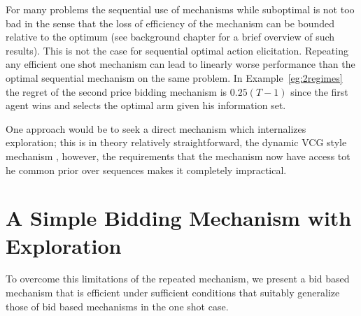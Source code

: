 For many problems the sequential use of mechanisms while suboptimal is not too bad in the sense that the loss of efficiency of the mechanism can be bounded relative to the optimum (see background chapter for a brief overview of such results).
This is not the case for sequential optimal action elicitation. Repeating any efficient one shot mechanism can lead to linearly worse performance than the optimal sequential mechanism on the same problem. In Example~\ref{eg:2regimes} the regret of the  second price bidding mechanism is $0.25(T-1)$ since the first agent wins and selects the optimal arm given his information set.










One approach would be to seek a direct mechanism which internalizes exploration; this is in theory relatively straightforward, the dynamic VCG style mechanism , however, the requirements that the mechanism now have access tot he common prior over sequences makes it completely impractical.




\section{A Simple Bidding Mechanism with Exploration}

To overcome this limitations of the repeated mechanism, we present a bid based mechanism that is efficient under sufficient conditions that suitably generalize those of bid based mechanisms in the one shot case. 

